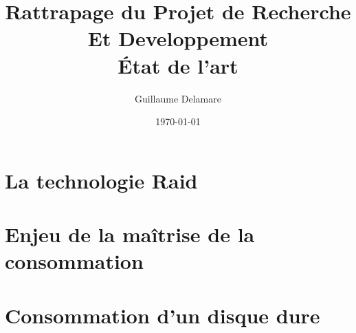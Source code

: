 \documentclass[a4paper, 12pt]{article}
\title{\Huge \textbf{Rattrapage du Projet de Recherche Et Developpement}\huge \\État de l'art}
\author{Guillaume Delamare}
\date{\today}
\begin{document}
	\maketitle
	\thispagestyle{empty}
	
	\clearpage
	
	\setcounter{tocdepth}{2}
	\renewcommand{\contentsname}{\Huge Sommaire}
	\tableofcontents

	\clearpage
	
	\section{La technologie Raid}
	\section{Enjeu de la maîtrise de la consommation}
	\section{Consommation d'un disque dure}
	
\end{document}
